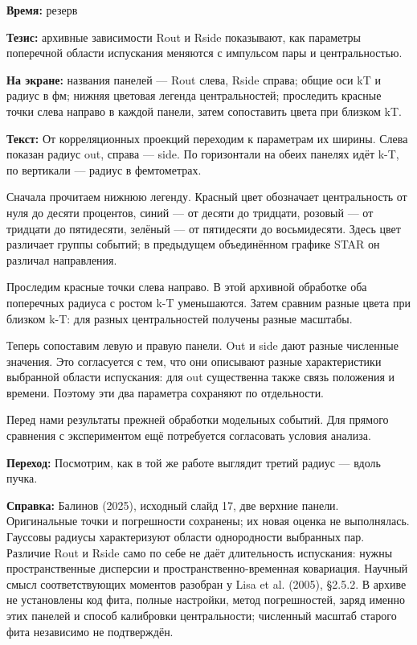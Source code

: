 \textbf{Время:} резерв

\textbf{Тезис:} архивные зависимости Rout и Rside показывают, как параметры поперечной области испускания меняются с импульсом пары и центральностью.

\textbf{На экране:} названия панелей — Rout слева, Rside справа; общие оси kT и радиус в фм; нижняя цветовая легенда центральностей; проследить красные точки слева направо в каждой панели, затем сопоставить цвета при близком kT.

\textbf{Текст:} От корреляционных проекций переходим к параметрам их ширины. Слева показан радиус out, справа — side. По горизонтали на обеих панелях идёт k-T, по вертикали — радиус в фемтометрах.

Сначала прочитаем нижнюю легенду. Красный цвет обозначает центральность от нуля до десяти процентов, синий — от десяти до тридцати, розовый — от тридцати до пятидесяти, зелёный — от пятидесяти до восьмидесяти. Здесь цвет различает группы событий; в предыдущем объединённом графике STAR он различал направления.

Проследим красные точки слева направо. В этой архивной обработке оба поперечных радиуса с ростом k-T уменьшаются. Затем сравним разные цвета при близком k-T: для разных центральностей получены разные масштабы.

Теперь сопоставим левую и правую панели. Out и side дают разные численные значения. Это согласуется с тем, что они описывают разные характеристики выбранной области испускания: для out существенна также связь положения и времени. Поэтому эти два параметра сохраняют по отдельности.

Перед нами результаты прежней обработки модельных событий. Для прямого сравнения с экспериментом ещё потребуется согласовать условия анализа.

\textbf{Переход:} Посмотрим, как в той же работе выглядит третий радиус — вдоль пучка.

\textbf{Справка:} Балинов (2025), исходный слайд 17, две верхние панели. Оригинальные точки и погрешности сохранены; их новая оценка не выполнялась. Гауссовы радиусы характеризуют области однородности выбранных пар. Различие Rout и Rside само по себе не даёт длительность испускания: нужны пространственные дисперсии и пространственно-временная ковариация. Научный смысл соответствующих моментов разобран у Lisa et al. (2005), §2.5.2. В архиве не установлены код фита, полные настройки, метод погрешностей, заряд именно этих панелей и способ калибровки центральности; численный масштаб старого фита независимо не подтверждён.
